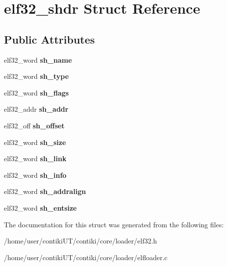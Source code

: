 \hypertarget{structelf32__shdr}{}\section{elf32\+\_\+shdr Struct Reference}
\label{structelf32__shdr}
\subsection*{Public Attributes}
\begin{DoxyCompactItemize}
\item 
\hypertarget{structelf32__shdr_a397da5153b2f7605b1ff1de6aefa6d72}{}elf32\+\_\+word {\bfseries sh\+\_\+name}\label{structelf32__shdr_a397da5153b2f7605b1ff1de6aefa6d72}

\item 
\hypertarget{structelf32__shdr_a575fd441213a3a2c01a2b9f8d76ae91a}{}elf32\+\_\+word {\bfseries sh\+\_\+type}\label{structelf32__shdr_a575fd441213a3a2c01a2b9f8d76ae91a}

\item 
\hypertarget{structelf32__shdr_a812f8d63ce30897a2aafc8eecca004af}{}elf32\+\_\+word {\bfseries sh\+\_\+flags}\label{structelf32__shdr_a812f8d63ce30897a2aafc8eecca004af}

\item 
\hypertarget{structelf32__shdr_a2f5302ddbc6ae2e7adc9d0747029ac07}{}elf32\+\_\+addr {\bfseries sh\+\_\+addr}\label{structelf32__shdr_a2f5302ddbc6ae2e7adc9d0747029ac07}

\item 
\hypertarget{structelf32__shdr_ac7185a5c368b86d7c5bde4261472d3ea}{}elf32\+\_\+off {\bfseries sh\+\_\+offset}\label{structelf32__shdr_ac7185a5c368b86d7c5bde4261472d3ea}

\item 
\hypertarget{structelf32__shdr_a99ef99ad56321d429d78a0d51fa55bc5}{}elf32\+\_\+word {\bfseries sh\+\_\+size}\label{structelf32__shdr_a99ef99ad56321d429d78a0d51fa55bc5}

\item 
\hypertarget{structelf32__shdr_afc854954cb010c23281293399a58c200}{}elf32\+\_\+word {\bfseries sh\+\_\+link}\label{structelf32__shdr_afc854954cb010c23281293399a58c200}

\item 
\hypertarget{structelf32__shdr_aa01fa67d235a73d8f05a1082ff639825}{}elf32\+\_\+word {\bfseries sh\+\_\+info}\label{structelf32__shdr_aa01fa67d235a73d8f05a1082ff639825}

\item 
\hypertarget{structelf32__shdr_ab0d2f72391dd49af989bc4a96320e510}{}elf32\+\_\+word {\bfseries sh\+\_\+addralign}\label{structelf32__shdr_ab0d2f72391dd49af989bc4a96320e510}

\item 
\hypertarget{structelf32__shdr_af97a639e2da493a81e104447e327b574}{}elf32\+\_\+word {\bfseries sh\+\_\+entsize}\label{structelf32__shdr_af97a639e2da493a81e104447e327b574}

\end{DoxyCompactItemize}


The documentation for this struct was generated from the following files\+:\begin{DoxyCompactItemize}
\item 
/home/user/contiki\+U\+T/contiki/core/loader/elf32.\+h\item 
/home/user/contiki\+U\+T/contiki/core/loader/elfloader.\+c\end{DoxyCompactItemize}
